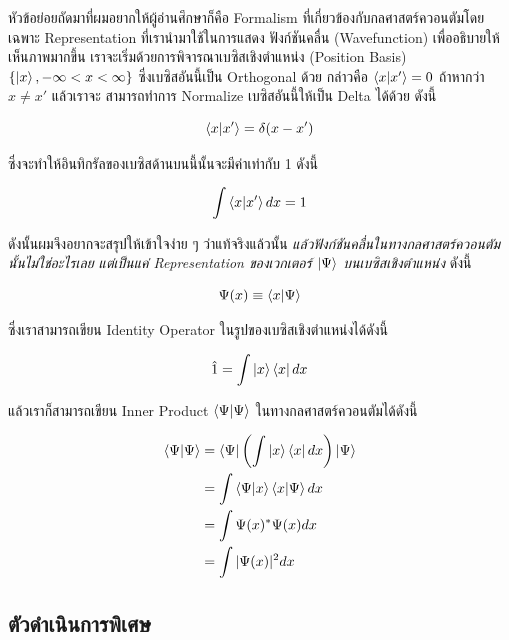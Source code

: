 หัวข้อย่อยถัดมาที่ผมอยากให้ผู้อ่านศึกษาก็คือ Formalism ที่เกี่ยวข้องกับกลศาสตร์ควอนตัมโดยเฉพาะ Representation ที่เรานำมาใช้ในการแสดง%
ฟังก์ชันคลื่น (Wavefunction) เพื่ออธิบายให้เห็นภาพมากขึ้น เราจะเริ่มด้วยการพิจารณาเบซิสเชิงตำแหน่ง (Position Basis) $\{ \ket{x},
    -\infty < x < \infty \}$ ซึ่งเบซิสอันนี้เป็น Orthogonal ด้วย กล่าวคือ $\braket{x}{x'} = 0$ ถ้าหากว่า $x \neq x'$ แล้วเราจะ%
สามารถทำการ Normalize เบซิสอันนี้ให้เป็น Delta ได้ด้วย ดังนี้

\begin{equation}
    \braket{x}{x'}
    =
    \delta(x - x')
\end{equation}

\noindent ซึ่งจะทำให้อินทิกรัลของเบซิสด้านบนนี้นั้นจะมีค่าเท่ากับ 1 ดังนี้

\begin{equation}
    \int \braket{x}{x'} dx
    =
    1
\end{equation}

ดังนั้นผมจึงอยากจะสรุปให้เข้าใจง่าย ๆ ว่าแท้จริงแล้วนั้น \textit{แล้วฟังก์ชันคลื่นในทางกลศาสตร์ควอนตัมนั้นไม่ใช่อะไรเลย แต่เป็นแค่
    Representation ของเวกเตอร์ $\ket{\Psi}$ บนเบซิสเชิงตำแหน่ง} ดังนี้

\begin{equation}
    \Psi(x) \equiv \braket{x}{\Psi}
\end{equation}

\noindent ซึ่งเราสามารถเขียน Identity Operator ในรูปของเบซิสเชิงตำแหน่งได้ดังนี้

\begin{equation}
    \hat{1}
    =
    \int \ket{x} \bra{x} dx
\end{equation}

\noindent แล้วเราก็สามารถเขียน Inner Product $\braket{\Psi}$ ในทางกลศาสตร์ควอนตัมได้ดังนี้

\begin{align}
    \braket{\Psi}
     & =
    \bra{\Psi} \left( \int \ket{x} \bra{x} dx \right) \ket{\Psi} \\
     & =
    \int \braket{\Psi}{x} \braket{x}{\Psi} dx                    \\
     & =
    \int \Psi(x)^* \Psi(x) dx                                    \\
     & =
    \int |\Psi(x)|^2 dx
\end{align}

\subsection{ตัวดำเนินการพิเศษ}

